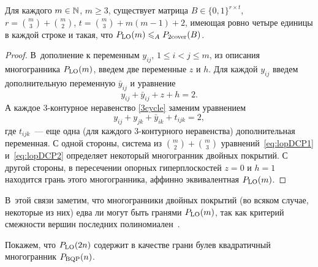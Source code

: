 \begin{prop}
Для каждого $m \in \mathbb{N}$, $m \ge 3$, существует матрица $B \in \{0,1\}^{r\times t}$, $r = \binom{m}{3} + \binom{m}{2}$, $t = \binom{m}{3} + m(m-1) + 2$,
имеющая ровно четыре единицы в каждой строке и такая, что $P_{\textup{LO}}(m) \leqslant_A P_{\textup{2cover}}(B)$.
\end{prop}	
\begin{proof}
В~дополнение к переменным $y_{ij}$, $1 \le i < j \le m$, из описания многогранника $P_{\textup{LO}}(m)$, введем две переменные $z$ и $h$. Для каждой $y_{ij}$ введем дополнительную переменную $\bar{y}_{ij}$ и уравнение
\begin{equation}\label{eq:lopDCP1}
y_{ij} + \bar{y}_{ij} + z + h = 2.
\end{equation}
А каждое 3-контурное неравенство \eqref{3cycle} заменим уравнением
\begin{equation}\label{eq:lopDCP2}
y_{ij} + y_{jk} + \bar{y}_{ik} + t_{ijk} = 2,
\end{equation}
где $t_{ijk}$~--- еще одна (для каждого 3-контурного неравенства) дополнительная переменная.
С одной стороны, система из $\binom{m}{2} + \binom{m}{3}$ уравнений~\eqref{eq:lopDCP1} и~\eqref{eq:lopDCP2} определяет некоторый многогранник двойных покрытий.
С другой стороны, в пересечении опорных гиперплоскостей $z=0$ и $h=1$
находится грань этого многогранника, аффинно эквивалентная $P_{\textup{LO}}(m)$.
\end{proof}

В~этой связи заметим, что многогранники двойных покрытий (во всяком случае, некоторые из них) едва ли могут быть гранями $P_{\textup{LO}}(m)$, так как критерий смежности вершин последних полиномиален~\cite{Young:1978}.

Покажем, что $P_{\textup{LO}}(2n)$ содержит в качестве грани булев квадратичный многогранник $P_{\textup{BQP}}(n)$.

